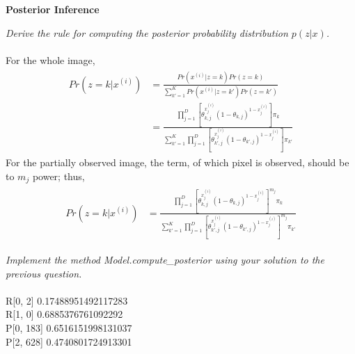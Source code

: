 \documentclass{myhw}
\begin{document}
\begin{homeworkProblem}
\textbf{Posterior Inference}
\begin{homeworkSection}
\emph{Derive the rule for computing the posterior probability distribution $p(z|x)$. } \\
\\
For the whole image, 
\begin{gather*}
\begin{aligned}
Pr(z=k|x^{(i)}) & = \frac{Pr(x^{(i)}|z=k) Pr(z=k)}{\sum_{k'=1}^K Pr(x^{(i)}|z=k') Pr(z=k') } \\
& = \frac{ \prod_{j=1}^D [ \theta_{k,j}^{x_j^{(i)}} (1-\theta_{k,j})^{1-x_j^{(i)}} ] \pi_k }{ \sum_{k'=1}^K \prod_{j=1}^D [ \theta_{k',j}^{x_j^{(i)}} (1-\theta_{k',j})^{1-x_j^{(i)}} ] \pi_{k'}}
\end{aligned}
\end{gather*}
For the partially observed image, the term, of which pixel is observed, should be to $m_j$ power; thus, 
\begin{gather*}
\begin{aligned}
Pr(z=k|x^{(i)}) & = \frac{ \prod_{j=1}^D [ \theta_{k,j}^{x_j^{(i)}} (1-\theta_{k,j})^{1-x_j^{(i)}} ]^{m_j} \pi_k }{ \sum_{k'=1}^K \prod_{j=1}^D [ \theta_{k',j}^{x_j^{(i)}} (1-\theta_{k',j})^{1-x_j^{(i)}} ]^{m_j} \pi_{k'}}
\end{aligned}
\end{gather*}
\end{homeworkSection}
\begin{homeworkSection}
\emph{Implement the method Model.compute\_posterior using your solution to the previous question. } \\
\\
R[0, 2] 0.17488951492117283 \\
R[1, 0] 0.6885376761092292 \\
P[0, 183] 0.6516151998131037 \\
P[2, 628] 0.4740801724913301 \\
\\
\end{homeworkSection}
\end{homeworkProblem}
\end{document}
